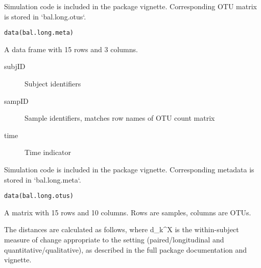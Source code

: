 \documentclass[a4paper]{book}
\begin{document}
%
\begin{Description}\relax
Simulation code is included in the package vignette. 
Corresponding OTU matrix is stored in `bal.long.otus`.
\end{Description}
%
\begin{Usage}
\begin{verbatim}
data(bal.long.meta)
\end{verbatim}
\end{Usage}
%
\begin{Format}
A data frame with 15 rows and 3 columns. 
\begin{description}

\item[subjID] Subject identifiers
\item[sampID] Sample identifiers, matches row names of OTU count matrix
\item[time] Time indicator

\end{description}
\end{Format}
%
\begin{Description}\relax
Simulation code is included in the package vignette. 
Corresponding metadata is stored in `bal.long.meta`.
\end{Description}
%
\begin{Usage}
\begin{verbatim}
data(bal.long.otus)
\end{verbatim}
\end{Usage}
%
\begin{Format}
A matrix with 15 rows and 10 columns. Rows are samples, columns are OTUs.
\end{Format}
%
\begin{Description}\relax
The distances are calculated as follows, where d\_k\textasciicircum{}X is the within-subject 
measure of change appropriate to the setting (paired/longitudinal and 
quantitative/qualitative), as described in the full package documentation 
and vignette. 
\end{Description}
\end{document}
